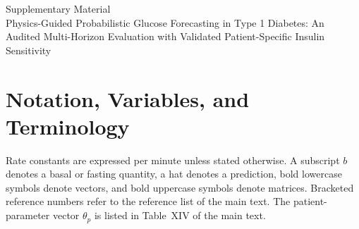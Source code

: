 \documentclass[10pt]{article}
\begin{document}
\begin{center}{\Large Supplementary Material}\\[4pt]
Physics-Guided Probabilistic Glucose Forecasting in Type 1 Diabetes: An Audited Multi-Horizon Evaluation with Validated Patient-Specific Insulin Sensitivity\end{center}

\section*{Notation, Variables, and Terminology}
Rate constants are expressed per minute unless stated otherwise. A subscript $b$ denotes a basal or fasting quantity, a hat denotes a prediction, bold lowercase symbols denote vectors, and bold uppercase symbols denote matrices. Bracketed reference numbers refer to the reference list of the main text. The patient-parameter vector $\theta_p$ is listed in Table~XIV of the main text.
\end{document}

